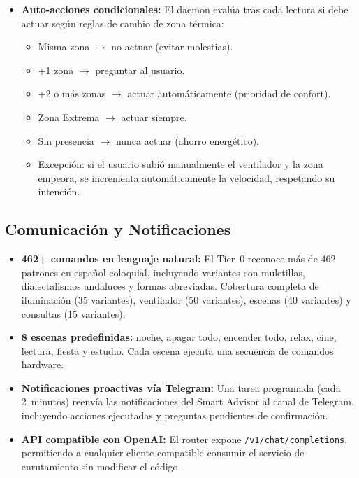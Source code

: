 \begin{itemize}
    \item \textbf{Auto-acciones condicionales:} El daemon evalúa tras cada lectura si debe actuar según reglas de cambio de zona térmica:
    \begin{itemize}
        \item Misma zona $\rightarrow$ no actuar (evitar molestias).
        \item +1 zona $\rightarrow$ preguntar al usuario.
        \item +2 o más zonas $\rightarrow$ actuar automáticamente (prioridad de confort).
        \item Zona Extrema $\rightarrow$ actuar siempre.
        \item Sin presencia $\rightarrow$ nunca actuar (ahorro energético).
        \item Excepción: si el usuario subió manualmente el ventilador y la zona empeora, se incrementa automáticamente la velocidad, respetando su intención.
    \end{itemize}
\end{itemize}

\subsection{Comunicación y Notificaciones}
\label{sec:comunicacion_notificaciones}

\begin{itemize}
    \item \textbf{462+ comandos en lenguaje natural:} El Tier~0 reconoce más de 462 patrones en español coloquial, incluyendo variantes con muletillas, dialectalismos andaluces y formas abreviadas. Cobertura completa de iluminación (35 variantes), ventilador (50 variantes), escenas (40 variantes) y consultas (15 variantes).
    
    \item \textbf{8 escenas predefinidas:} noche, apagar todo, encender todo, relax, cine, lectura, fiesta y estudio. Cada escena ejecuta una secuencia de comandos hardware.
    
    \item \textbf{Notificaciones proactivas vía Telegram:} Una tarea programada (cada 2~minutos) reenvía las notificaciones del Smart Advisor al canal de Telegram, incluyendo acciones ejecutadas y preguntas pendientes de confirmación.
    
    \item \textbf{API compatible con OpenAI:} El router expone \texttt{/v1/chat/completions}, permitiendo a cualquier cliente compatible consumir el servicio de enrutamiento sin modificar el código.
\end{itemize}

